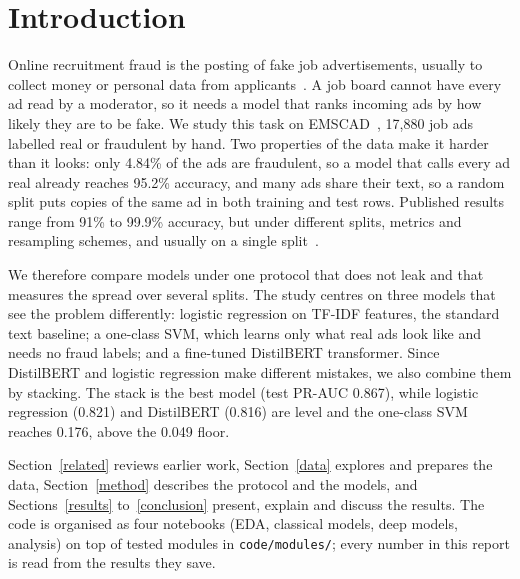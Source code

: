 \section{Introduction}
\label{intro}

Online recruitment fraud is the posting of fake job advertisements, usually to collect money or
personal data from applicants~\cite{vidros2017}. A job board cannot have every ad read by a
moderator, so it needs a model that ranks incoming ads by how likely they are to be fake. We study
this task on EMSCAD~\cite{vidros2017}, 17,880 job ads labelled real or fraudulent by hand. Two
properties of the data make it harder than it looks: only 4.84\% of the ads are fraudulent, so a
model that calls every ad real already reaches 95.2\% accuracy, and many ads share their text, so a
random split puts copies of the same ad in both training and test rows. Published results range
from 91\% to 99.9\% accuracy, but under different splits, metrics and resampling schemes, and
usually on a single split~\cite{taneja2025,amaar2022}.

We therefore compare models under one protocol that does not leak and that measures the spread
over several splits. The study centres on three models that see the problem differently: logistic
regression on TF-IDF features, the standard text baseline; a one-class SVM, which learns only what
real ads look like and needs no fraud labels; and a fine-tuned DistilBERT transformer. Since
DistilBERT and logistic regression make different mistakes, we also combine them by stacking.
The stack is the best model (test PR-AUC 0.867), while logistic regression (0.821) and DistilBERT
(0.816) are level and the one-class SVM reaches 0.176, above the 0.049 floor.

Section~\ref{related} reviews earlier work, Section~\ref{data} explores and prepares the data,
Section~\ref{method} describes the protocol and the models, and Sections~\ref{results}
to~\ref{conclusion} present, explain and discuss the results. The code is organised as four
notebooks (EDA, classical models, deep models, analysis) on top of tested modules in
\texttt{code/modules/}; every number in this report is read from the results they save.
